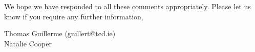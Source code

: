 \documentclass[12pt,letterpaper]{article}
\begin{document}
We hope we have responded to all these comments appropriately. Please let us know if you require any further information,\\
\bigskip




Thomas Guillerme (guillert@tcd.ie)\\ %
Natalie Cooper
\end{document}
